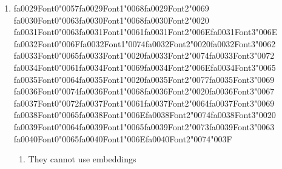 \documentclass[12pt]{article}
\begin{document}
\begin{enumerate}[label=Q\arabic*.]
\begin{enumerate}[label=(\Alph*)]
    \item To ensure the output values sum to 1, representing a probability distribution
    \item To prevent the gradients from exploding
    \item To increase the speed of the training process
    \item To allow the model to handle variable-length sequences
\end{enumerate}
\item {\csname fa0029Font0\endcsname\char"0057}{\csname fa0029Font1\endcsname\char"0068}{\csname fa0029Font2\endcsname\char"0069} {\csname fa0030Font0\endcsname\char"0063}{\csname fa0030Font1\endcsname\char"0068}{\csname fa0030Font2\endcsname\char"0020} {\csname fa0031Font0\endcsname\char"0063}{\csname fa0031Font1\endcsname\char"0061}{\csname fa0031Font2\endcsname\char"006E}{\csname fa0031Font3\endcsname\char"006E} {\csname fa0032Font0\endcsname\char"006F}{\csname fa0032Font1\endcsname\char"0074}{\csname fa0032Font2\endcsname\char"0020}{\csname fa0032Font3\endcsname\char"0062} {\csname fa0033Font0\endcsname\char"0065}{\csname fa0033Font1\endcsname\char"0020}{\csname fa0033Font2\endcsname\char"0074}{\csname fa0033Font3\endcsname\char"0072} {\csname fa0034Font0\endcsname\char"0061}{\csname fa0034Font1\endcsname\char"0069}{\csname fa0034Font2\endcsname\char"006E}{\csname fa0034Font3\endcsname\char"0065} {\csname fa0035Font0\endcsname\char"0064}{\csname fa0035Font1\endcsname\char"0020}{\csname fa0035Font2\endcsname\char"0077}{\csname fa0035Font3\endcsname\char"0069} {\csname fa0036Font0\endcsname\char"0074}{\csname fa0036Font1\endcsname\char"0068}{\csname fa0036Font2\endcsname\char"0020}{\csname fa0036Font3\endcsname\char"0067} {\csname fa0037Font0\endcsname\char"0072}{\csname fa0037Font1\endcsname\char"0061}{\csname fa0037Font2\endcsname\char"0064}{\csname fa0037Font3\endcsname\char"0069} {\csname fa0038Font0\endcsname\char"0065}{\csname fa0038Font1\endcsname\char"006E}{\csname fa0038Font2\endcsname\char"0074}{\csname fa0038Font3\endcsname\char"0020} {\csname fa0039Font0\endcsname\char"0064}{\csname fa0039Font1\endcsname\char"0065}{\csname fa0039Font2\endcsname\char"0073}{\csname fa0039Font3\endcsname\char"0063} {\csname fa0040Font0\endcsname\char"0065}{\csname fa0040Font1\endcsname\char"006E}{\csname fa0040Font2\endcsname\char"0074}{\char"003F}
\begin{enumerate}[label=(\Alph*)]
    \item They cannot use embeddings

\end{enumerate}
\end{enumerate}
\end{document}
